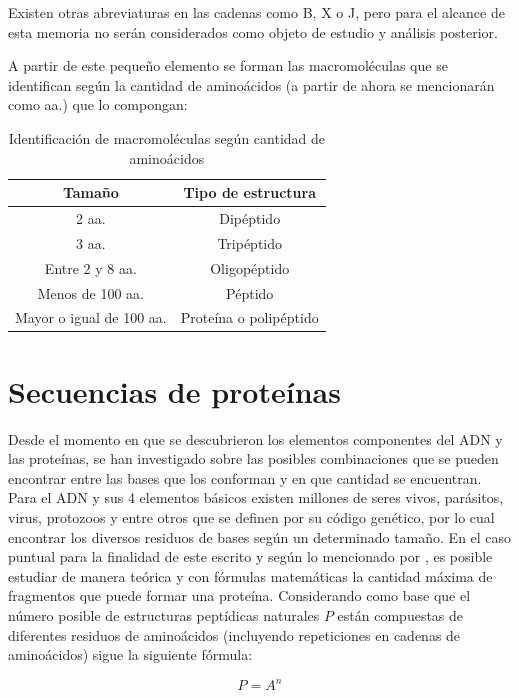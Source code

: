 Existen otras abreviaturas en las cadenas como B, X o J, pero para el alcance de esta memoria no serán considerados como objeto de estudio y análisis posterior.

A partir de este pequeño elemento se forman las macromoléculas que se identifican según la cantidad de aminoácidos (a partir de ahora se mencionarán como aa.) que lo compongan:

\begin{table}[H]
\centering
\label{my-label1}
\begin{tabular}{|c|c|}
\hline
Tamaño & \multicolumn{1}{c|}{Tipo de estructura}  \\ \hline
2 aa.     & Dipéptido        \\
3 aa.     & Tripéptido                         \\
Entre 2 y 8 aa.      &      Oligopéptido                             \\
Menos de 100 aa.      &   Péptido       \\
Mayor o igual de 100 aa.   &   Proteína o polipéptido            \\ \hline
\end{tabular}
\caption{Identificación de macromoléculas según cantidad de aminoácidos}
\end{table}

\section{Secuencias de proteínas}

Desde el momento en que se descubrieron los elementos componentes del ADN y las proteínas, se han investigado sobre las posibles combinaciones que se pueden encontrar entre las bases que los conforman y en que cantidad se encuentran. Para el ADN y sus 4 elementos básicos existen millones de seres vivos, parásitos, virus, protozoos y entre otros que se definen por su código genético, por lo cual encontrar los diversos residuos de bases según un determinado tamaño. En el caso puntual para la finalidad de este escrito y según lo mencionado por \cite{zamyatnin1}, es posible estudiar de manera teórica y con fórmulas matemáticas la cantidad máxima de fragmentos que puede formar una proteína. Considerando como base que el número posible de estructuras peptídicas naturales $P$ están compuestas de diferentes residuos de aminoácidos (incluyendo repeticiones en cadenas de aminoácidos) sigue la siguiente fórmula:

\begin{equation}
P=A^{n}
\end{equation}


